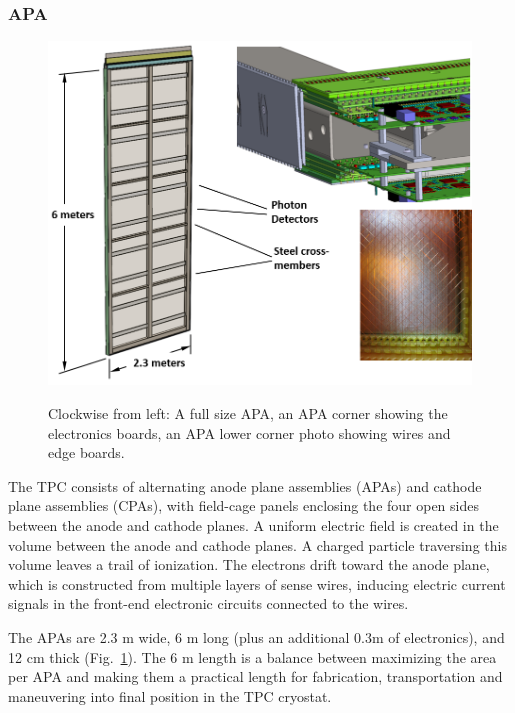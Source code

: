 
\subsubsection{APA}


\begin{figure}[t]
  \centering
\includegraphics[width=\linewidth]{figures/TPC_APA_1}
\label{fig:tpc_apa_overview}
  \caption{Clockwise from left: A full size APA, an APA corner showing the electronics boards, an APA lower corner photo showing wires and edge boards. }
\end{figure}


The TPC consists of alternating anode plane assemblies (APAs) and cathode plane assemblies (CPAs), with field-cage panels enclosing the four open sides between the anode and cathode planes.  A uniform electric field is created in the volume between the anode and cathode planes. A charged particle traversing this volume leaves a trail of ionization. The electrons drift toward the anode plane, which is constructed from multiple layers of sense wires, inducing electric current signals in the front-end electronic circuits connected to the wires.

The APAs are 2.3 m wide, 6 m long (plus an additional 0.3m of electronics), and 12 cm thick (Fig.~\ref{fig:tpc_apa_overview}).  The 6 m length is a balance between maximizing the area per APA and making them a practical length for fabrication, transportation and maneuvering into final position in the TPC cryostat.

